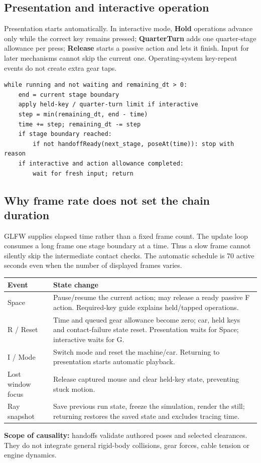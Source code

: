 \documentclass[a4paper,10pt]{article}
\numberwithin{equation}{section}
\begin{document}
\subsection*{Presentation and interactive operation}
Presentation starts automatically. In interactive mode, \textbf{Hold} operations advance only while the correct key remains pressed; \textbf{QuarterTurn} adds one quarter-stage allowance per press; \textbf{Release} starts a passive action and lets it finish. Input for later mechanisms cannot skip the current one. Operating-system key-repeat events do not create extra gear taps.
\begin{lstlisting}
while running and not waiting and remaining_dt > 0:
    end = current stage boundary
    apply held-key / quarter-turn limit if interactive
    step = min(remaining_dt, end - time)
    time += step; remaining_dt -= step
    if stage boundary reached:
        if not handoffReady(next_stage, poseAt(time)): stop with reason
    if interactive and action allowance completed:
        wait for fresh input; return
\end{lstlisting}
\subsection*{Why frame rate does not set the chain duration}
GLFW supplies elapsed time rather than a fixed frame count. The update loop consumes a long frame one stage boundary at a time. Thus a slow frame cannot silently skip the intermediate contact checks. The automatic schedule is 70 active seconds even when the number of displayed frames varies.
\par\noindent\begin{tabularx}{\linewidth}{@{}p{29mm}Y@{}}
\toprule
\textbf{Event} & \textbf{State change}\\\midrule
Space & Pause/resume the current action; may release a ready passive F action. Required-key guide explains held/tapped operations.\\
R / Reset & Time and queued gear allowance become zero; car, held keys and contact-failure state reset. Presentation waits for Space; interactive waits for G.\\
I / Mode & Switch mode and reset the machine/car. Returning to presentation starts automatic playback.\\
Lost window focus & Release captured mouse and clear held-key state, preventing stuck motion.\\
Ray snapshot & Save previous run state, freeze the simulation, render the still; returning restores the saved state and excludes tracing time.\\
\bottomrule
\end{tabularx}\par
\begin{notebox}
\textbf{Scope of causality:} handoffs validate authored poses and selected clearances. They do not integrate general rigid-body collisions, gear forces, cable tension or engine dynamics.
\end{notebox}
\end{document}
